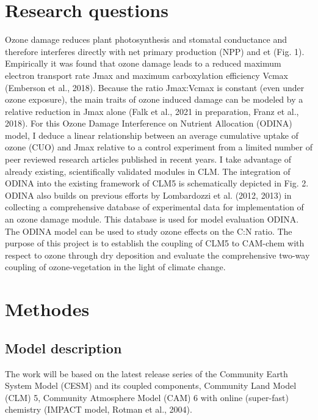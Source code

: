 \documentclass[11pt, letter, oneside, article]{memoir}
\begin{document}
\chapter{Research questions}
Ozone damage reduces plant photosynthesis and stomatal conductance and therefore interferes directly with net primary production (NPP) and \gls{et} (Fig. 1). Empirically it was found that ozone damage leads to a reduced maximum electron transport rate Jmax and maximum carboxylation efficiency Vcmax (Emberson et al., 2018). Because the ratio Jmax:Vcmax is constant (even under ozone exposure), the main traits of ozone induced damage can be modeled by a relative reduction in Jmax alone (Falk et al., 2021 in preparation, Franz et al., 2018). For this Ozone Damage Interference on Nutrient Allocation (ODINA) model, I deduce a linear relationship between an average cumulative uptake of ozone (CUO) and Jmax relative to a control experiment from a limited number of peer reviewed research articles published in recent years. I take advantage of already existing, scientifically validated modules in CLM. The integration of ODINA into the existing framework of CLM5 is schematically depicted in Fig. 2. ODINA also builds on previous efforts by Lombardozzi et al. (2012, 2013) in collecting a comprehensive database of experimental data for implementation of an ozone damage module. This database is used for model evaluation ODINA. The ODINA model can be used to study ozone effects on the C:N ratio. The purpose of this project is to establish the coupling of CLM5 to CAM-chem with respect to ozone through dry deposition and evaluate the comprehensive two-way coupling of ozone-vegetation in the light of climate change.

\chapter{Methodes}
\section*{Model description}
The work will be based on the latest release series of the Community Earth System Model (CESM) and its coupled components, Community Land Model (CLM) 5, Community Atmosphere Model (CAM) 6 with online (super-fast) chemistry (IMPACT model, Rotman et al., 2004).
\end{document}
